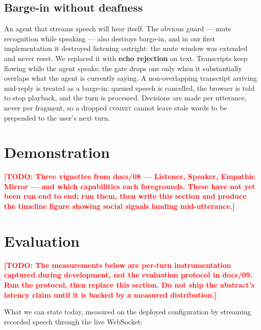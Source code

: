 \documentclass[conference]{IEEEtran}
\newcommand{\todo}[1]{\textcolor{red}{\textbf{[TODO: #1]}}}
\begin{document}
\subsection{Barge-in without deafness}
\label{sec:barge}

An agent that streams speech will hear itself. The obvious guard --- mute
recognition while speaking --- also destroys barge-in, and in our first
implementation it destroyed listening outright: the mute window was extended and
never reset. We replaced it with \textbf{echo rejection} on text. Transcripts
keep flowing while the agent speaks; the gate drops one only when it
substantially overlaps what the agent is currently saying. A non-overlapping
transcript arriving mid-reply is treated as a barge-in: queued speech is
cancelled, the browser is told to stop playback, and the turn is processed.
Decisions are made per utterance, never per fragment, so a dropped
\textsc{commit} cannot leave stale words to be prepended to the user's next turn.

\section{Demonstration}
\label{sec:demo}

\todo{Three vignettes from docs/08 --- Listener, Speaker, Empathic Mirror ---
and which capabilities each foregrounds. These have not yet been run end to end;
run them, then write this section and produce the timeline figure showing
social signals landing mid-utterance.}

\section{Evaluation}
\label{sec:eval}

\todo{The measurements below are per-turn instrumentation captured during
development, not the evaluation protocol in docs/09. Run the protocol, then
replace this section. Do not ship the abstract's latency claim until it is
backed by a measured distribution.}

What we can state today, measured on the deployed configuration by streaming
recorded speech through the live WebSocket:
\end{document}
